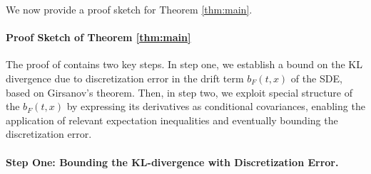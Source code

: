 
We now provide a proof sketch for  Theorem \ref{thm:main}. 

\paragraph{Proof Sketch of Theorem \ref{thm:main}}
The proof of  contains two key steps. In step one, we establish a bound on the KL divergence due to discretization error in the drift term $b_F(t,x)$ of the SDE, based on Girsanov's theorem. 
Then, in step two, we exploit special structure of the $b_F(t,x)$ by expressing its derivatives as conditional covariances, enabling the application of relevant expectation inequalities and eventually bounding the discretization error. 







\paragraph{Step One: Bounding the KL-divergence with Discretization Error.}

